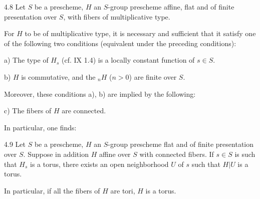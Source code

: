 \begin{corollary}{4.8}\label{X.4.8}
Let $S$ be a prescheme, $H$ an $S$-group prescheme affine, flat and of finite presentation over $S$, with fibers of multiplicative type.

For $H$ to be of multiplicative type, it is necessary and sufficient that it satisfy one of the following two conditions (equivalent under the preceding conditions):

a) The type of $H_s$ (cf. IX 1.4) is a locally constant function of $s\in S$.

b) $H$ is commutative, and the ${}_nH$ ($n>0$) are finite over $S$.

Moreover, these conditions a), b) are implied by the following:

c) The fibers of $H$ are connected.
\end{corollary}
In particular, one finds:
\begin{corollary}{4.9}\label{X.4.9}
Let $S$ be a prescheme, $H$ an $S$-group prescheme flat and of finite presentation over $S$. Suppose in addition $H$ affine over $S$ with connected fibers. If $s\in S$ is such that $H_s$ is a torus, there exists an open neighborhood $U$ of $s$ such that $H|U$ is a torus.

In particular, if all the fibers of $H$ are tori, $H$ is a torus.
\end{corollary}

